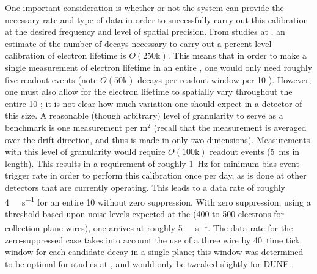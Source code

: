 One important consideration is whether or not the   system can provide the necessary rate and type of data in order to successfully carry out this calibration at the desired frequency and level of spatial precision. From studies at , an estimate of the number of decays necessary to carry out a percent-level calibration of electron lifetime is $O(\mathrm{250k})$. This means that in order to make a single measurement of electron lifetime in an entire , one would only need roughly five readout events (note $O(\mathrm{50k})$ decays per readout window per \SI{10}{\kt} ). However, one must also allow for the electron lifetime to spatially vary throughout the entire \SI{10}{\kt} ; it is not clear how much variation one should expect in a detector of this size. A reasonable (though arbitrary) level of granularity to serve as a benchmark is one measurement per $\mathrm{m}^{2}$ (recall that the measurement is averaged over the drift direction, and thus is made in only two dimensions). Measurements with this level of granularity would require $O(\mathrm{100k})$ readout events (\SI{5}{\milli\s} in length). This results in a requirement of roughly \SI{1}{\hertz} for minimum-bias event trigger rate in order to perform this calibration once per day, as is done at other  detectors that are currently operating. 
This leads to a data rate of roughly \SI{4}{\giga\byte\per\s} for an entire \SI{10}{\kt}  without zero suppression. With zero suppression, using a threshold based upon noise levels expected at the  (\num{400} to \num{500} electrons for collection plane wires), one arrives at roughly \SI{5}{\mega\byte\per\s}. The data rate for the zero-suppressed case takes into account the use of a three wire by \num{40}~time tick window for each candidate decay in a single plane; this window was determined to be optimal for studies at , and would only be tweaked slightly for DUNE. 

